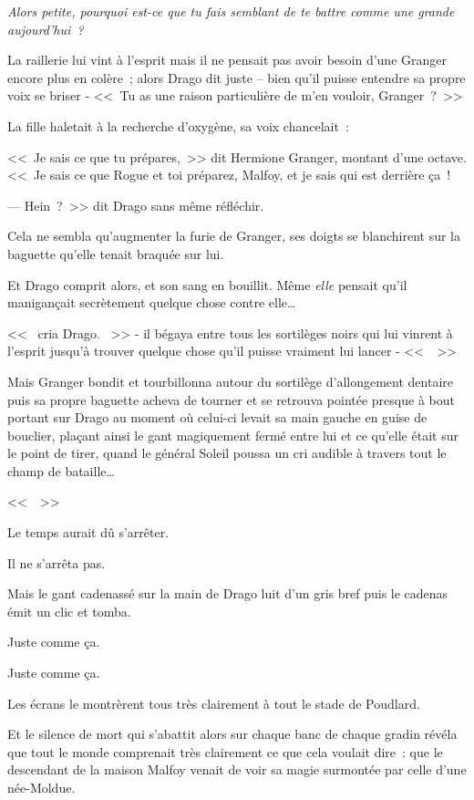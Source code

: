 \emph{Alors petite, pourquoi est-ce que tu fais semblant de te battre comme une grande aujourd'hui~?}

La raillerie lui vint à l'esprit mais il ne pensait pas avoir besoin d'une Granger encore plus en colère~; alors Drago dit juste -- bien qu'il puisse entendre sa propre voix se briser - <<~Tu as une raison particulière de m'en vouloir, Granger~?~>>

La fille haletait à la recherche d'oxygène, sa voix chancelait~:

<<~Je sais ce que tu prépares,~>> dit Hermione Granger, montant d'une octave. <<~Je sais ce que Rogue et toi préparez, Malfoy, et je sais qui est derrière ça~!

--- Hein~?~>> dit Drago sans même réfléchir.

Cela ne sembla qu'augmenter la furie de Granger, ses doigts se blanchirent sur la baguette qu'elle tenait braquée sur lui.

Et Drago comprit alors, et son sang en bouillit. Même \emph{elle} pensait qu'il manigançait secrètement quelque chose contre elle…

<<~ cria Drago. ~>> - il bégaya entre tous les sortilèges noirs qui lui vinrent à l'esprit jusqu'à trouver quelque chose qu'il puisse vraiment lui lancer - <<~~>>

Mais Granger bondit et tourbillonna autour du sortilège d'allongement dentaire puis sa propre baguette acheva de tourner et se retrouva pointée presque à bout portant sur Drago au moment où celui-ci levait sa main gauche en guise de bouclier, plaçant ainsi le gant magiquement fermé entre lui et ce qu'elle était sur le point de tirer, quand le général Soleil poussa un cri audible à travers tout le champ de bataille…

<<~~>>

Le temps aurait dû s'arrêter.

Il ne s'arrêta pas.

Mais le gant cadenassé sur la main de Drago luit d'un gris bref puis le cadenas émit un clic et tomba.

Juste comme ça.

Juste comme ça.

Les écrans le montrèrent tous très clairement à tout le stade de Poudlard.

Et le silence de mort qui s'abattit alors sur chaque banc de chaque gradin révéla que tout le monde comprenait très clairement ce que cela voulait dire~: que le descendant de la maison Malfoy venait de voir sa magie surmontée par celle d'une née-Moldue.

